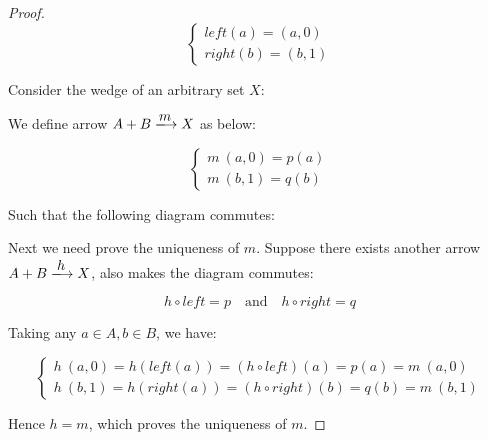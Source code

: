 \documentclass[UTF8]{article}
\begin{document}
\begin{proof}
\[
\begin{cases}
left(a) = (a, 0) \\
right(b) = (b, 1)
\end{cases}
\]

Consider the wedge of an arbitrary set $X$:

\begin{center}
\end{center}

We define arrow $A + B \arrowto{m} X$ as below:

\[
\begin{cases}
m\ (a, 0) = p(a) \\
m\ (b, 1) = q(b)
\end{cases}
\]

Such that the following diagram commutes:

\begin{center}
\end{center}

Next we need prove the uniqueness of $m$. Suppose there exists another arrow $A + B \arrowto{h} X$, also makes the diagram commutes:

\[
h \circ left = p \quad \text{and} \quad h \circ right = q
\]

Taking any $a \in A, b \in B$, we have:

\[
\begin{cases}
h\ (a, 0) = h(left(a)) = (h \circ left)(a) = p(a) = m\ (a, 0) \\
h\ (b, 1) = h(right(a)) = (h \circ right)(b) = q(b) = m\ (b, 1)
\end{cases}
\]

Hence $h = m$, which proves the uniqueness of $m$.
\end{proof}

\ifx\wholebook\relax \else

\expandafter\enddocument

\fi
\end{document}
